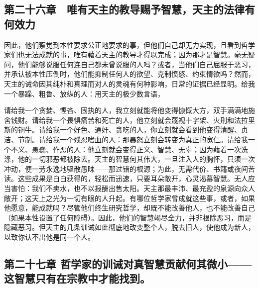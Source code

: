 
\subsection{第二十六章　唯有天主的教导赐予智慧，天主的法律有何效力}

因此，他们察觉到本性要求公正地要求的事，但他们自己却无力实现，且看到哲学家们也无法成就的事，唯有藉着天主的教导才得以完成；因为那才是智慧。毫无疑问，他们能够说服任何连自己都未曾说服的人吗？或者，当他们自己屈服于恶习，并承认被本性压倒时，他们能抑制任何人的欲望、克制愤怒、约束情欲吗？然而，天主的诫命因其纯朴和真理而对人的灵魂有何种影响，日常的证据已经显明。给我一个暴躁、粗鲁、放纵的人：用天主的极少数言语，\par

\par

请给我一个贪婪、悭吝、固执的人，我立刻就能将他变得慷慨大方，双手满满地施舍钱财。请给我一个畏惧痛苦和死亡的人，他立刻就会蔑视十字架、火刑和法拉里斯的铜牛。请给我一个好色、通奸、贪吃的人，你立刻就会看到他变得清醒、贞洁、节制。请给我一个残忍嗜血的人：那暴怒立刻会转变为真正的宽仁。请给我一个不义、愚蠢、作恶的人：他立刻就会变得正义、智慧、无辜；因为藉着一次洗涤，他的一切邪恶都被除去。天主的智慧何其伟大，一旦注入人的胸怀，只须一次冲动，便一劳永逸地驱散愚昧——那过错的根源；为此，无需代价、书籍或夜间苦读。这些成果是白白获得的，轻松而迅速，只要耳朵敞开，心灵渴慕智慧。无人应当害怕：我们不卖水，也不以报酬出售太阳。天主那最丰沛、最充盈的泉源向众人敞开；这天上之光为一切有眼的人升起。有哪位哲学家曾成就这些事，或者，如果他愿意，能成就吗？尽管他们终生研究哲学，却既不能改善他人，也不能改善自己（如果本性设置了任何障碍）。因此，他们的智慧竭尽全力，并非根除恶习，而是隐藏恶习。但天主的几条训诫如此彻底地改变整个人，脱去旧人，使他成为新人，以致你认不出他是同一个人。\par


\subsection{第二十七章 哲学家的训诫对真智慧贡献何其微小——这智慧只有在宗教中才能找到。}

